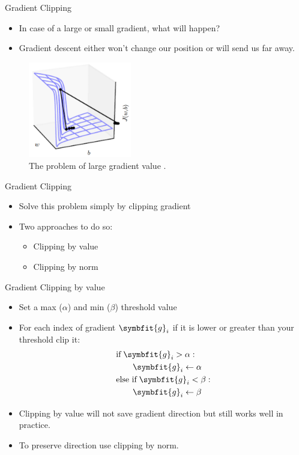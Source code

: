 \begin{frame}{Gradient Clipping}
    \begin{itemize}
        \item In case of a large or small gradient, what will happen?
        \pause
        \item Gradient descent either {\color{red} won't change our position} or will {\color{red} send us far away}.
    \end{itemize}
	\begin{figure}[H]
		\centering
		\includegraphics[width=0.4\textwidth]{Images/gard-clipping-1.png}
		\caption{The problem of large gradient value \cite{Goodfellow-et-al-2016}.}
	\end{figure}
\end{frame}

\begin{frame}{Gradient Clipping}
	\begin{itemize}
		\item Solve this problem simply by clipping gradient
		\item Two approaches to do so:
		\begin{itemize}
			\item Clipping by value
			\item Clipping by norm
		\end{itemize} 
	\end{itemize}
\end{frame}

\begin{frame}{Gradient Clipping by value}
	\begin{itemize}
		\item Set a max ($\alpha$) and min ($\beta$) threshold value
		\item For each index of gradient $\symbfit{g}_i$ if it is lower or greater than your threshold clip it:
		\[
		\begin{aligned}
			&\text{if} \; \symbfit{g}_i > \alpha: \\
			&\qquad \symbfit{g}_i \gets \alpha \\
			&\text{else if} \; \symbfit{g}_i < \beta: \\
			&\qquad \symbfit{g}_i \gets \beta
		\end{aligned}
		\]
		\item Clipping by value will not save gradient direction but still works well in practice.
		\item To preserve direction use clipping by norm.
	\end{itemize}
\end{frame}

